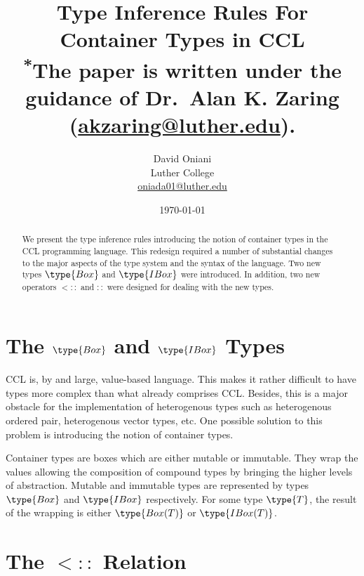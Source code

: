 \documentclass{article}
\author{David Oniani\\
        Luther College\\
        \href{mailto:oniada01@luther.edu}{oniada01@luther.edu}}
\title{\textbf{Type Inference Rules For Container Types in CCL}\\
       \medskip
       \small \textsuperscript{*}The paper is written under the guidance of
       Dr.\ Alan K. Zaring
       (\href{mailto:akzaring@luther.edu}{akzaring@luther.edu}).}
\date{\today}
\newcommand\ltypeof{\mathrel{::}}
\newcommand\subtypecont{\mathrel{<::}}
\begin{document}
\maketitle


\begin{abstract}
\noindent We present the type inference rules introducing the notion of
container types in the CCL programming language. This redesign required a
number of substantial changes to the major aspects of the type system and the
syntax of the language. Two new types $\type{Box}$ and $\type{IBox}$ were
introduced. In addition, two new operators $\subtypecont$ and $\ltypeof$ were
designed for dealing with the new types.
\end{abstract}


\section*{The $\type{Box}$ and $\type{IBox}$ Types}

CCL is, by and large, value-based language. This makes it rather difficult to
have types more complex than what already comprises CCL. Besides, this is a
major obstacle for the implementation of heterogenous types such as
heterogenous ordered pair, heterogenous vector types, etc. One possible
solution to this problem is introducing the notion of container types.

\medskip

Container types are boxes which are either mutable or immutable. They wrap the
values allowing the composition of compound types by bringing the higher levels
of abstraction. Mutable and immutable types are represented by types
$\type{Box}$ and $\type{IBox}$ respectively. For some type $\type{T}$, the
result of the wrapping is either $\type{Box(T)}$ or $\type{IBox(T)}$.


\section*{The $\subtypecont$ Relation}
\end{document}

